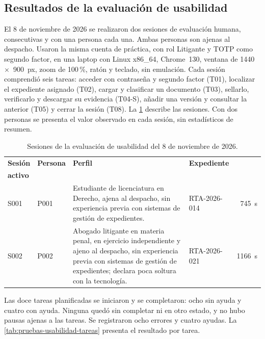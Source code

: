 \subsection{Resultados de la evaluación de usabilidad}\label{sec:pruebas-usabilidad-resultados}
El 8 de noviembre de 2026 se realizaron dos sesiones de evaluación humana,
consecutivas y con una persona cada una. Ambas personas son ajenas al despacho.
Usaron la misma cuenta de práctica, con rol Litigante y TOTP como segundo
factor, en una laptop con Linux x86\_64, Chrome~130, ventana de
1440~$\times$~900~px, zoom de 100\,\%, ratón y teclado, sin emulación. Cada
sesión comprendió seis tareas: acceder con contraseña y segundo factor (T01),
localizar el expediente asignado (T02), cargar y clasificar un documento (T03),
sellarlo, verificarlo y descargar su evidencia (T04-S), añadir una versión y
consultar la anterior (T05) y cerrar la sesión (T08). La
\cref{tab:pruebas-usabilidad-sesiones} describe las sesiones. Con dos personas
se presenta el valor observado en cada sesión, sin estadísticos de resumen.

\begin{table}[H]
  \centering
  \caption{Sesiones de la evaluación de usabilidad del 8 de noviembre de 2026.}
  \label{tab:pruebas-usabilidad-sesiones}
  
  \begin{tabularx}{\linewidth}{@{}l l X l r@{}}
    \toprule
    \textbf{Sesión} & \textbf{Persona} & \textbf{Perfil} & \textbf{Expediente} & \makecell[r]{\textbf{Tiempo}\\\textbf{activo}} \\
    \midrule
    S001 & P001 & Estudiante de licenciatura en Derecho, ajena al despacho, sin experiencia previa con sistemas de gestión de expedientes. & RTA-2026-014 & 745~s \\
    \addlinespace
    S002 & P002 & Abogado litigante en materia penal, en ejercicio independiente y ajeno al despacho, sin experiencia previa con sistemas de gestión de expedientes; declara poca soltura con la tecnología. & RTA-2026-021 & 1166~s \\
    \bottomrule
  \end{tabularx}
\end{table}

Las doce tareas planificadas se iniciaron y se completaron: ocho sin ayuda y
cuatro con ayuda. Ninguna quedó sin completar ni en otro estado, y no hubo
pausas ajenas a las tareas. Se registraron ocho errores y cuatro ayudas. La
\cref{tab:pruebas-usabilidad-tareas} presenta el resultado por tarea.

